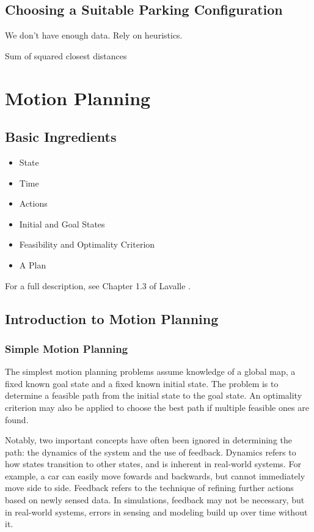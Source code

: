 \section{Choosing a Suitable Parking Configuration}
We don't have enough data.
Rely on heuristics.

Sum of squared closest distances




\chapter{Motion Planning}
\section{Basic Ingredients}
\begin{itemize}
\item State
\item Time
\item Actions
\item Initial and Goal States
\item Feasibility and Optimality Criterion
\item A Plan
\end{itemize}

For a full description, see Chapter 1.3 of Lavalle \cite{lavalle2006planning}.
\section{Introduction to Motion Planning}
\subsection{Simple Motion Planning}
The simplest motion planning problems assume knowledge of a global map, a fixed
known goal state and a fixed known initial state. The problem is to determine a
feasible path from the initial state to the goal state. An optimality criterion
may also be applied to choose the best path if multiple feasible ones are found.

Notably, two important concepts have often been ignored in determining the path:
the dynamics of the system and the use of feedback. Dynamics refers to how
states transition to other states, and is inherent in real-world systems. For
example, a car can easily move fowards and backwards, but cannot immediately
move side to side. Feedback refers to the technique of refining further actions
based on newly sensed data. In simulations, feedback may not be necessary, but
in real-world systems, errors in sensing and modeling build up over time without
it.

